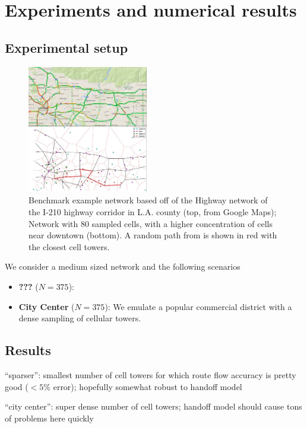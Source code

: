 
\section{Experiments and numerical results}

\subsection{Experimental setup}
\begin{figure}[h!]
  \centering
    \includegraphics[width=0.47\textwidth]{figures/small_map_half.jpeg}
  \caption{\footnotesize{Benchmark example network based off of the Highway network of the I-210 highway corridor in L.A. county (top, from Google Maps); Network with 80 sampled cells, with a higher concentration of cells near downtown (bottom). A random path from is shown in red with the closest cell towers.}}
  \label{fig:small-network}
\end{figure}

We consider a medium sized network and the following scenarios
\begin{itemize}
\item \textbf{???} ($N=375$):
\item \textbf{City Center} ($N=375$): We emulate a popular commercial district with a dense sampling of cellular towers.
\end{itemize}

\subsection{Results}

“sparser”: smallest number of cell towers for which route flow accuracy is pretty good ($<5\%$ error); hopefully somewhat robust to handoff model

“city center”: super dense number of cell towers; handoff model should cause tons of problems here quickly

